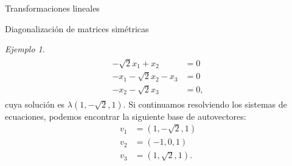 \documentclass[a4paper,12pt,twoside,spanish,reqno]{amsbook}
\numberwithin{equation}{section}
\theoremstyle{definition}
\theoremstyle{remark}
\newtheorem*{ejemplo*}{Ejemplo}
\begin{document}
\begin{chapter}{Transformaciones lineales}
\begin{section}{Diagonalización de matrices simétricas}
\begin{ejemplo*}
\begin{align*}
        \begin{split}
        -\sqrt 2x_1+ x_2  &= 0 \\
        -x_1 -\sqrt 2x_2  -x_3 &=0 \\
        -x_2 -\sqrt 2x_3 &= 0,  
        \end{split}
        \end{align*}
        cuya solución es $\lambda(1, -\sqrt2, 1)$. Si continuamos resolviendo los sistemas de ecuaciones, podemos encontrar la siguiente base de autovectores:
        \begin{align*}
        v_1 &= (1, -\sqrt2, 1) \\		
        v_2 &= (-1, 0, 1) \\		
        v_3 &= (1, \sqrt2, 1).
        \end{align*}
        
    \end{ejemplo*}
    
    \end{section}

        
    \end{chapter}
\end{document}
